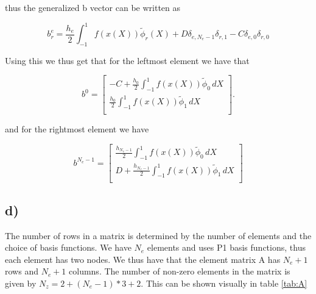 \documentclass[norsk,a4paper,12pt]{scrartcl}
\begin{document}
thus the generalized b vector can be written as 

\begin{equation*}
    b_r^e = \frac{h_e}{2}\int_{-1}^1 f(x(X))\tilde{\phi}_r(X) + D\delta_{e,N_e-1}\delta_{r, 1} - C\delta_{e,0}\delta_{r, 0}
\end{equation*}

Using this we thus get that for the leftmost element we have that 

\begin{equation*}
    b^{0} = 
    \begin{bmatrix}
    -C + \frac{h_{0}}{2}\int_{-1}^1 f(x(X))\tilde{\phi}_0\, dX \\
    \frac{h_{0}}{2}\int_{-1}^1 f(x(X))\tilde{\phi}_1\, dX \\
    \end{bmatrix}.
\end{equation*}



and for the rightmost element we have 

\begin{equation*}
    b^{N_e-1} = 
    \begin{bmatrix}
    \frac{h_{N_e-1}}{2}\int_{-1}^1 f(x(X))\tilde{\phi}_0\, dX \\
    D + \frac{h_{N_e-1}}{2}\int_{-1}^1 f(x(X))\tilde{\phi}_1\, dX \\
    \end{bmatrix}
\end{equation*}

\subsection{d)}
The number of rows in a matrix is determined by the number of elements and the choice of basis functions. We have $N_e$ elements and uses P1 basis functions, thus each element has two nodes. We thus have that the element matrix A has $N_e+1$ rows and $N_e+1$ columns. The number of non-zero elements in the matrix is given by $N_z = 2 + (N_{e}-1)*3 + 2$. This can be shown visually in table \ref{tab:A}
\end{document}
